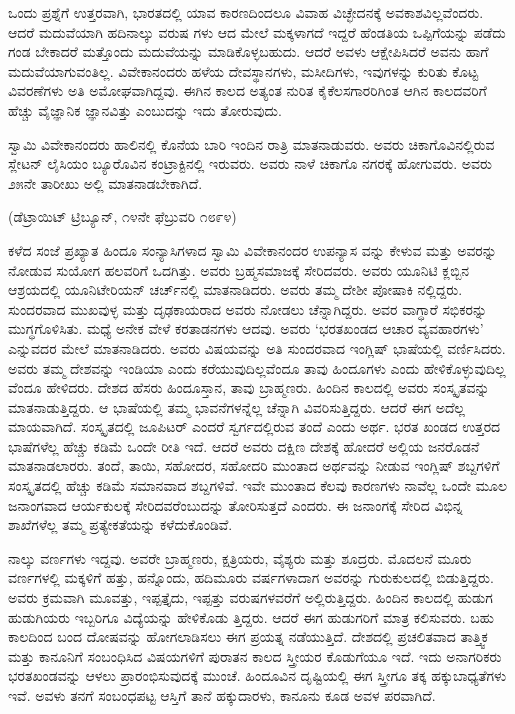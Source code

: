 ಒಂದು ಪ್ರಶ್ನೆಗೆ ಉತ್ತರವಾಗಿ, ಭಾರತದಲ್ಲಿ ಯಾವ ಕಾರಣದಿಂದಲೂ ವಿವಾಹ ವಿಚ್ಛೇದನಕ್ಕೆ ಅವಕಾಶವಿಲ್ಲವೆಂದರು. ಆದರೆ ಮದುವೆಯಾಗಿ ಹದಿನಾಲ್ಕು ವರುಷ ಗಳು ಆದ ಮೇಲೆ ಮಕ್ಕಳಾಗದೆ ಇದ್ದರೆ ಹೆಂಡತಿಯ ಒಪ್ಪಿಗೆಯನ್ನು ಪಡೆದು ಗಂಡ ಬೇಕಾದರೆ ಮತ್ತೊಂದು ಮದುವೆಯನ್ನು ಮಾಡಿಕೊಳ್ಳಬಹುದು. ಆದರೆ ಅವಳು ಆಕ್ಷೇಪಿಸಿದರೆ ಅವನು ಹಾಗೆ ಮದುವೆಯಾಗುವಂತಿಲ್ಲ. ವಿವೇಕಾನಂದರು ಹಳೆಯ ದೇವಸ್ಥಾನಗಳು, ಮಸೀದಿಗಳು, ಇವುಗಳನ್ನು ಕುರಿತು ಕೊಟ್ಟ ವಿವರಣೆಗಳು ಅತಿ ಅಮೋಘವಾಗಿದ್ದವು. ಈಗಿನ ಕಾಲದ ಅತ್ಯಂತ ನುರಿತ ಕೈಕೆಲಸಗಾರರಿಗಿಂತ ಆಗಿನ ಕಾಲದವರಿಗೆ ಹೆಚ್ಚು ವೈಜ್ಞಾನಿಕ ಜ್ಞಾನವಿತ್ತು ಎಂಬುದನ್ನು ಇದು ತೋರುವುದು.

ಸ್ವಾಮಿ ವಿವೇಕಾನಂದರು  ಹಾಲಿನಲ್ಲಿ ಕೊನೆಯ ಬಾರಿ ಇಂದಿನ ರಾತ್ರಿ ಮಾತನಾಡುವರು. ಅವರು ಚಿಕಾಗೊವಿನಲ್ಲಿರುವ ಸ್ಲೇಟನ್​ ಲೈಸಿಯಂ ಬ್ಯೂರೊವಿನ ಕಂಟ್ರಾಕ್ಟಿನಲ್ಲಿ ಇರುವರು. ಅವರು ನಾಳೆ ಚಿಕಾಗೊ ನಗರಕ್ಕೆ ಹೋಗುವರು. ಅವರು ೨೫ನೇ ತಾರೀಖು ಅಲ್ಲಿ ಮಾತನಾಡಬೇಕಾಗಿದೆ.

\delimiter

\begin{center}
(ಡೆಟ್ರಾಯಿಟ್​ ಟ್ರಿಬ್ಯೂನ್​, ೧೪ನೇ ಫೆಬ್ರುವರಿ ೧೮೯೪)
\end{center}

ಕಳೆದ ಸಂಜೆ ಪ್ರಖ್ಯಾತ ಹಿಂದೂ ಸಂನ್ಯಾಸಿಗಳಾದ ಸ್ವಾಮಿ ವಿವೇಕಾನಂದರ ಉಪನ್ಯಾಸ ವನ್ನು ಕೇಳುವ ಮತ್ತು ಅವರನ್ನು ನೋಡುವ ಸುಯೋಗ ಹಲವರಿಗೆ ಒದಗಿತ್ತು. ಅವರು ಬ್ರಹ್ಮಸಮಾಜಕ್ಕೆ ಸೇರಿದವರು. ಅವರು ಯೂನಿಟಿ ಕ್ಲಬ್ಬಿನ ಆಶ್ರಯದಲ್ಲಿ ಯೂನಿಟೇರಿಯನ್​ ಚರ್ಚ್​ನಲ್ಲಿ ಮಾತನಾಡಿದರು. ಅವರು ತಮ್ಮ ದೇಶೀ ಪೋಷಾಕಿ ನಲ್ಲಿದ್ದರು. ಸುಂದರವಾದ ಮುಖವುಳ್ಳ ಮತ್ತು ದೃಢಕಾಯರಾದ ಅವರು ನೋಡಲು ಚೆನ್ನಾಗಿದ್ದರು. ಅವರ ವಾಗ್ಧಾರೆ ಸಭಿಕರನ್ನು ಮುಗ್ಧಗೊಳಿಸಿತು. ಮಧ್ಯೆ ಅನೇಕ ವೇಳೆ ಕರತಾಡನಗಳು ಆದವು. ಅವರು ‘ಭರತಖಂಡದ ಆಚಾರ ವ್ಯವಹಾರಗಳು’ ಎನ್ನುವದರ ಮೇಲೆ ಮಾತನಾಡಿದರು. ಅವರು ವಿಷಯವನ್ನು ಅತಿ ಸುಂದರವಾದ ಇಂಗ್ಲಿಷ್​ ಭಾಷೆಯಲ್ಲಿ ವರ್ಣಿಸಿದರು. ಅವರು ತಮ್ಮ ದೇಶವನ್ನು ಇಂಡಿಯಾ ಎಂದು ಕರೆಯುವುದಿಲ್ಲವೆಂದೂ ತಾವು ಹಿಂದೂಗಳು ಎಂದು ಹೇಳಿಕೊಳ್ಳುವುದಿಲ್ಲ ವೆಂದೂ ಹೇಳಿದರು. ದೇಶದ ಹೆಸರು ಹಿಂದೂಸ್ತಾನ, ತಾವು ಬ್ರಾಹ್ಮಣರು. ಹಿಂದಿನ ಕಾಲದಲ್ಲಿ ಅವರು ಸಂಸ್ಕೃತವನ್ನು ಮಾತನಾಡುತ್ತಿದ್ದರು. ಆ ಭಾಷೆಯಲ್ಲಿ ತಮ್ಮ ಭಾವನೆಗಳನ್ನೆಲ್ಲ ಚೆನ್ನಾಗಿ ವಿವರಿಸುತ್ತಿದ್ದರು. ಆದರೆ ಈಗ ಅದೆಲ್ಲ ಮಾಯವಾಗಿದೆ. ಸಂಸ್ಕೃತದಲ್ಲಿ ಜೂಪಿಟರ್​ ಎಂದರೆ ಸ್ವರ್ಗದಲ್ಲಿರುವ ತಂದೆ ಎಂದು ಅರ್ಥ. ಭರತ ಖಂಡದ ಉತ್ತರದ ಭಾಷೆಗಳೆಲ್ಲ ಹೆಚ್ಚು ಕಡಿಮೆ ಒಂದೇ ರೀತಿ ಇದೆ. ಆದರೆ ಅವರು ದಕ್ಷಿಣ ದೇಶಕ್ಕೆ ಹೋದರೆ ಅಲ್ಲಿಯ ಜನರೊಡನೆ ಮಾತನಾಡಲಾರರು. ತಂದೆ, ತಾಯಿ, ಸಹೋದರ, ಸಹೋದರಿ ಮುಂತಾದ ಅರ್ಥವನ್ನು ನೀಡುವ ಇಂಗ್ಲಿಷ್​ ಶಬ್ದಗಳಿಗೆ ಸಂಸ್ಕೃತದಲ್ಲಿ ಹೆಚ್ಚು ಕಡಿಮೆ ಸಮಾನವಾದ ಶಬ್ದಗಳಿವೆ. ಇವೇ ಮುಂತಾದ ಕೆಲವು ಕಾರಣಗಳು ನಾವೆಲ್ಲ ಒಂದೇ ಮೂಲ ಜನಾಂಗವಾದ ಆರ್ಯಕುಲಕ್ಕೆ ಸೇರಿದವರೆಂಬುದನ್ನು ತೋರಿಸುತ್ತದೆ ಎಂದರು. ಈ ಜನಾಂಗಕ್ಕೆ ಸೇರಿದ ವಿಭಿನ್ನ ಶಾಖೆಗಳೆಲ್ಲ ತಮ್ಮ ಪ್ರತ್ಯೇಕತೆಯನ್ನು ಕಳೆದುಕೊಂಡಿವೆ.

ನಾಲ್ಕು ವರ್ಣಗಳು ಇದ್ದವು. ಅವರೇ ಬ್ರಾಹ್ಮಣರು, ಕ್ಷತ್ರಿಯರು, ವೈಶ್ಯರು ಮತ್ತು ಶೂದ್ರರು. ಮೊದಲನೆ ಮೂರು ವರ್ಣಗಳಲ್ಲಿ ಮಕ್ಕಳಿಗೆ ಹತ್ತು, ಹನ್ನೊಂದು, ಹದಿಮೂರು ವರ್ಷಗಳಾದಾಗ ಅವರನ್ನು ಗುರುಕುಲದಲ್ಲಿ ಬಿಡುತ್ತಿದ್ದರು. ಅವರು ಕ್ರಮವಾಗಿ ಮೂವತ್ತು, ಇಪ್ಪತ್ತೈದು, ಇಪ್ಪತ್ತು ವರುಷಗಳವರೆಗೆ ಅಲ್ಲಿರುತ್ತಿದ್ದರು. ಹಿಂದಿನ ಕಾಲದಲ್ಲಿ ಹುಡುಗ ಹುಡುಗಿಯರು ಇಬ್ಬರಿಗೂ ವಿದ್ಯೆಯನ್ನು ಹೇಳಿಕೊಡು ತ್ತಿದ್ದರು. ಆದರೆ ಈಗ ಹುಡುಗರಿಗೆ ಮಾತ್ರ ಕಲಿಸುವರು. ಬಹು ಕಾಲದಿಂದ ಬಂದ ದೋಷವನ್ನು ಹೋಗಲಾಡಿಸಲು ಈಗ ಪ್ರಯತ್ನ ನಡೆಯುತ್ತಿದೆ. ದೇಶದಲ್ಲಿ ಪ್ರಚಲಿತವಾದ ತಾತ್ತ್ವಿಕ ಮತ್ತು ಕಾನೂನಿಗೆ ಸಂಬಂಧಿಸಿದ ವಿಷಯಗಳಿಗೆ ಪುರಾತನ ಕಾಲದ ಸ್ತ್ರೀಯರ ಕೊಡುಗೆಯೂ ಇದೆ. ಇದು ಅನಾಗರಿಕರು ಭರತಖಂಡವನ್ನು ಆಳಲು ಪ್ರಾರಂಭಿಸುವುದಕ್ಕೆ ಮುಂಚೆ. ಹಿಂದೂವಿನ ದೃಷ್ಟಿಯಲ್ಲಿ ಈಗ ಸ್ತ್ರೀಗೂ ತಕ್ಕ ಹಕ್ಕುಬಾಧ್ಯತೆಗಳು ಇವೆ. ಅವಳು ತನಗೆ ಸಂಬಂಧಪಟ್ಟ ಆಸ್ತಿಗೆ ತಾನೆ ಹಕ್ಕುದಾರಳು, ಕಾನೂನು ಕೂಡ ಅವಳ ಪರವಾಗಿದೆ.

